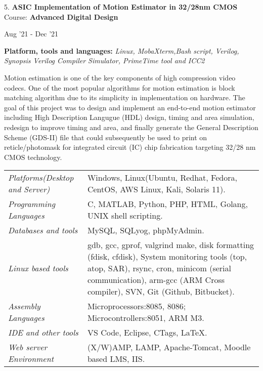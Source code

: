 \documentclass[10pt]{article}
\renewcommand{\section}[2]%
        {\pagebreak[3]\vspace{1.3\baselineskip}%
         \phantomsection\addcontentsline{toc}{section}{#1}%
         \hspace{0in}%
         \marginpar{
         \raggedright \scshape #1}#2}
\newenvironment{innerlist}[1][\enskip\textbullet]%
        {\begin{compactitem}[#1]}{\end{compactitem}}
\newenvironment{loneinnerlist}[1][\enskip\textbullet]%
        {\vspace{-\baselineskip}\begin{compactitem}[#1]}
        {\end{compactitem}\vspace{-.6\baselineskip}}
\begin{document}
\begin{loneinnerlist}
\item[5.]\textbf{ASIC Implementation of Motion Estimator in 32/28nm CMOS} \\ 
\vspace{4pt}
Course: \textbf{Advanced Digital Design} \\
\vspace*{-28pt} \begin{flushright} Aug '21 - Dec '21 \end{flushright}
\textbf{Platform, tools and languages:} \emph{Linux, MobaXterm,Bash script, Verilog, Synopsis Verilog Compiler Simulator, PrimeTime tool and ICC2}
\vspace*{2pt}
\begin{innerlist} \item Motion estimation is one of the key components of high compression video codecs. One of the most popular algorithms for motion estimation is block matching algorithm due to its simplicity in implementation on hardware. The goal of this project was to design and implement an end-to-end motion estimator including High Description Langugue (HDL) design, timing and area simulation, redesign to improve timing and area, and finally generate the General Description Scheme (GDS-II) file that could subsequently be used to print on reticle/photomask for integrated circuit (IC) chip fabrication targeting 32/28 nm CMOS technology.
\end{innerlist}  \vspace*{4pt}
\end{loneinnerlist}%


\section{Skills}
%
\begin{tabular}[t]{l p{2.9in}}
\emph{Platforms(Desktop and Server)}  &  Windows, Linux(Ubuntu, Redhat, Fedora, CentOS, AWS Linux, Kali, Solaris 11).\\
\emph{Programming Languages}  & C, MATLAB, Python, PHP, HTML, Golang, UNIX shell scripting.\\
\emph{Databases and tools}  & MySQL, SQLyog, phpMyAdmin.\\
\emph{Linux based tools}  &  gdb, gcc, gprof, valgrind make, disk formatting (fdisk, cfdisk), System monitoring tools (top, atop, SAR), rsync, cron, minicom (serial communication), arm-gcc (ARM Cross compiler), SVN, Git (Github, Bitbucket).\\
\emph{Assembly Languages}  &  Microprocessors:8085, 8086; Microcontrollers:8051, ARM M3.\\
\emph{IDE and other tools}  & VS Code, Eclipse, CTags, \LaTeX{}.\\
\emph{Web server Environment}  & (X/W)AMP, LAMP, Apache-Tomcat, Moodle based LMS, IIS.\\
\end{tabular}
\end{document}
